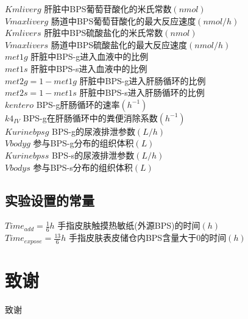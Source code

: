 \documentclass[a4paper,punct=banjiao,twoside]{ctexrep}
\theoremstyle{plain}
\theoremstyle{definition}
\theoremstyle{remark}
\begin{document}
$ Kmliverg$ {\hfill  肝脏中BPS葡萄苷酸化的米氏常数$(nmol)$}\\
$Vmaxliverg$ {\hfill  肠道中BPS葡萄苷酸化的最大反应速度$(nmol/h)$}\\
$ Kmlivers$ {\hfill  肝脏中BPS硫酸盐化的米氏常数$(nmol)$}\\
$Vmaxlivers$ {\hfill  肠道中BPS硫酸盐化的最大反应速度$(nmol/h)$}\\
$met1g $ {\hfill  肝脏中BPS-g进入血液中的比例}\\
$ met1s$ {\hfill  肝脏中BPS-s进入血液中的比例}\\
$met2g = 1 -  met1g$ {\hfill  肝脏中BPS-g进入肝肠循环的比例}\\
$ met2s= 1 -  met1s$ {\hfill  肝脏中BPS-s进入肝肠循环的比例}\\
$ kentero$ {\hfill  BPS-g肝肠循环的速率$(h^{-1})$}\\
$k4_{IV} $ {\hfill  BPS-g在肝肠循环中的粪便消除系数$(h^{-1})$}\\
$ Kurinebpsg$ {\hfill  BPS-g的尿液排泄参数$(L/h)$}\\
$Vbodyg  $ {\hfill  参与BPS-g分布的组织体积$(L)$}\\
$ Kurinebpss$ {\hfill  BPS-s的尿液排泄参数$(L/h)$}\\
$ Vbodys$ {\hfill  参与BPS-s分布的组织体积$(L)$}

\section*{实验设置的常量}
\noindent$Time_{add}=\frac{1}{6}h$ {\hfill  手指皮肤触摸热敏纸(外源BPS)的时间$(h)$}\\
$Time_{expose}=\frac{13}{6}h$ {\hfill  手指皮肤表皮储仓内BPS含量大于0的时间$(h)$}\\

% 



\clearpage
\mbox{}
\thispagestyle{empty}

\chapter*{致\quad 谢}
\normalsize
致谢
\end{document}
